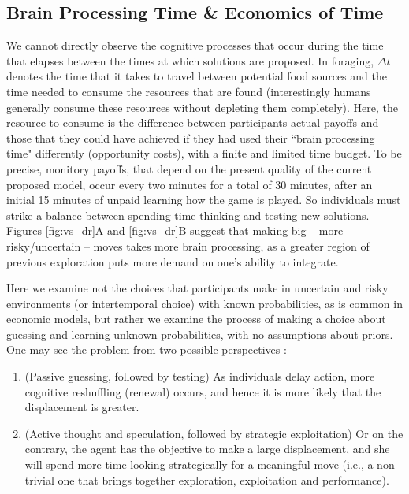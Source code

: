 \subsection{Brain Processing Time \& Economics of Time}
We cannot directly observe the cognitive processes that occur during the time that elapses between the times at which solutions are proposed. In foraging, $\Delta t$ denotes the time that it takes to travel between potential food sources and the time needed to consume the resources that are found (interestingly humans generally consume these resources without depleting them completely). Here, the resource to consume is the difference between participants actual payoffs and those that they could have achieved if they had used their ``brain processing time" differently (opportunity costs), with a finite and limited time budget. To be precise, monitory payoffs, that depend on the present quality of the current proposed model, occur every two minutes for a total of 30 minutes, after an initial 15 minutes of unpaid learning how the game is played. So individuals must strike a balance between spending time thinking and testing new solutions.  Figures \ref{fig:vs_dr}A and \ref{fig:vs_dr}B suggest that making big -- more risky/uncertain -- moves takes more brain processing, as a greater region of previous exploration puts more demand on one's ability to integrate. 

Here we examine not the choices that participants make in uncertain and risky environments (or intertemporal choice) with known probabilities, as is common in economic models, but rather we examine the process of making a choice about guessing and learning unknown probabilities, with no assumptions about priors.  One may see the problem from two possible perspectives : 


\begin{enumerate}
  \item (Passive guessing, followed by testing) As individuals delay action, more cognitive reshuffling (renewal) occurs, and hence it is more likely that the displacement is greater.
  \item (Active thought and speculation, followed by strategic exploitation) Or on the contrary, the agent has the objective to make a large displacement, and she will spend more time looking strategically for a meaningful move (i.e., a non-trivial one that brings together exploration, exploitation and performance).
\end{enumerate}

